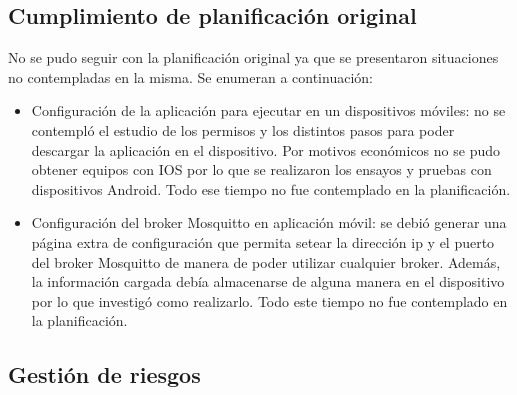 \subsection{Cumplimiento de planificación original}

No se pudo seguir con la planificación original ya que se presentaron situaciones no contempladas en la misma. Se enumeran a continuación:

\begin{itemize}

\item Configuración de la aplicación para ejecutar en un dispositivos móviles: no se contempló el estudio de los permisos y los distintos pasos para poder descargar la aplicación en el dispositivo. Por motivos económicos no se pudo obtener equipos con IOS  por lo que se realizaron los ensayos y pruebas con dispositivos Android. Todo ese tiempo no fue contemplado en la planificación.
\item Configuración del broker Mosquitto en aplicación móvil: se debió generar una página extra de configuración que permita setear la dirección ip y el puerto del broker Mosquitto de manera de poder utilizar cualquier broker. Además, la información cargada debía almacenarse de alguna manera en el dispositivo por lo que investigó como realizarlo. Todo este tiempo no fue contemplado en la planificación.

\end{itemize}

\subsection{Gestión de riesgos}

